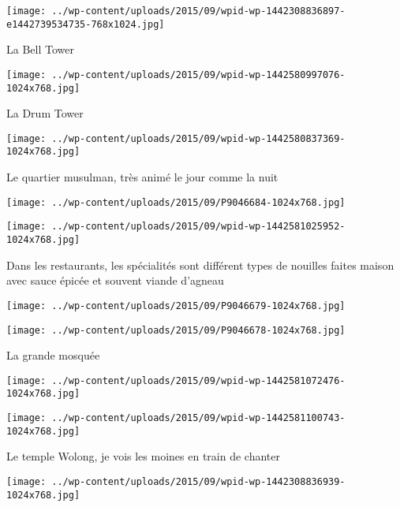  \newline
\centerline{\texttt{[image: ../wp-content/uploads/2015/09/wpid-wp-1442308836897-e1442739534735-768x1024.jpg]} } 
 \newline
 La Bell Tower \newline
 \newline
\centerline{\texttt{[image: ../wp-content/uploads/2015/09/wpid-wp-1442580997076-1024x768.jpg]} } 
 \newline
 La Drum Tower \newline
 \newline
\centerline{\texttt{[image: ../wp-content/uploads/2015/09/wpid-wp-1442580837369-1024x768.jpg]} } 
 \newline
 Le quartier musulman, très animé le jour comme la nuit \newline
 \newline
\centerline{\texttt{[image: ../wp-content/uploads/2015/09/P9046684-1024x768.jpg]} } 
 \newline
 \newline
\centerline{\texttt{[image: ../wp-content/uploads/2015/09/wpid-wp-1442581025952-1024x768.jpg]} } 
 \newline
 Dans les restaurants, les spécialités sont différent types de nouilles faites maison avec sauce épicée et souvent viande d'agneau \newline
 \newline
\centerline{\texttt{[image: ../wp-content/uploads/2015/09/P9046679-1024x768.jpg]} } 
 \newline
 \newline
\centerline{\texttt{[image: ../wp-content/uploads/2015/09/P9046678-1024x768.jpg]} } 
 \newline
 La grande mosquée \newline
 \newline
\centerline{\texttt{[image: ../wp-content/uploads/2015/09/wpid-wp-1442581072476-1024x768.jpg]} } 
 \newline
 \newline
\centerline{\texttt{[image: ../wp-content/uploads/2015/09/wpid-wp-1442581100743-1024x768.jpg]} } 
 \newline
 Le temple Wolong, je vois les moines en train de chanter \newline
 \newline
\centerline{\texttt{[image: ../wp-content/uploads/2015/09/wpid-wp-1442308836939-1024x768.jpg]} } 

